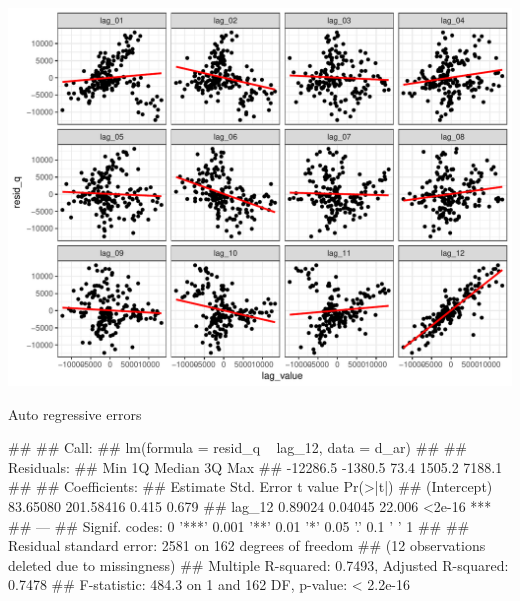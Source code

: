\documentclass[11pt,ignorenonframetext,]{beamer}
\let\oldverbatim\verbatim
\let\endoldverbatim\endverbatim
\renewenvironment{verbatim}{\footnotesize\begin{spacing}{0.9}\oldverbatim}{\endoldverbatim\end{spacing}}
\begin{document}
\begin{frame}{}

\includegraphics{Lec6_files/figure-beamer/unnamed-chunk-15-1.pdf}

\end{frame}

\begin{frame}[fragile]{Auto regressive errors}

\begin{verbatim}
## 
## Call:
## lm(formula = resid_q ~ lag_12, data = d_ar)
## 
## Residuals:
##      Min       1Q   Median       3Q      Max 
## -12286.5  -1380.5     73.4   1505.2   7188.1 
## 
## Coefficients:
##              Estimate Std. Error t value Pr(>|t|)    
## (Intercept)  83.65080  201.58416   0.415    0.679    
## lag_12        0.89024    0.04045  22.006   <2e-16 ***
## ---
## Signif. codes:  0 '***' 0.001 '**' 0.01 '*' 0.05 '.' 0.1 ' ' 1
## 
## Residual standard error: 2581 on 162 degrees of freedom
##   (12 observations deleted due to missingness)
## Multiple R-squared:  0.7493, Adjusted R-squared:  0.7478 
## F-statistic: 484.3 on 1 and 162 DF,  p-value: < 2.2e-16
\end{verbatim}

\end{frame}
\end{document}
